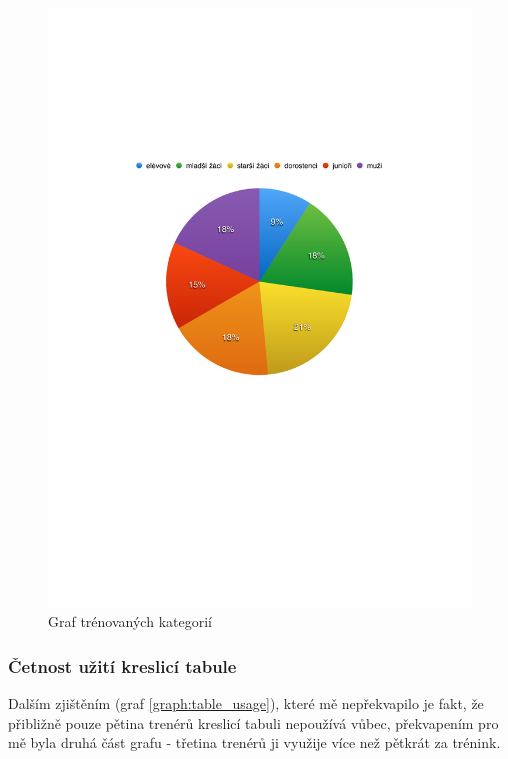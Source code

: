 \documentclass[thesis=B,czech]{FITthesis}[2012/06/26]
\begin{document}
	\begin{figure}
		\includegraphics{img/graph_category}
		\caption{Graf trénovaných kategorií}\label{graph:category}
	\end{figure}

\subsubsection{Četnost užití kreslicí tabule}

	Dalším zjištěním (graf \ref{graph:table_usage}), které mě nepřekvapilo je fakt, že přibližně pouze pětina trenérů kreslicí tabuli nepoužívá vůbec, překvapením pro mě byla druhá část grafu \-- třetina trenérů ji využije více než pětkrát za trénink.
\end{document}
